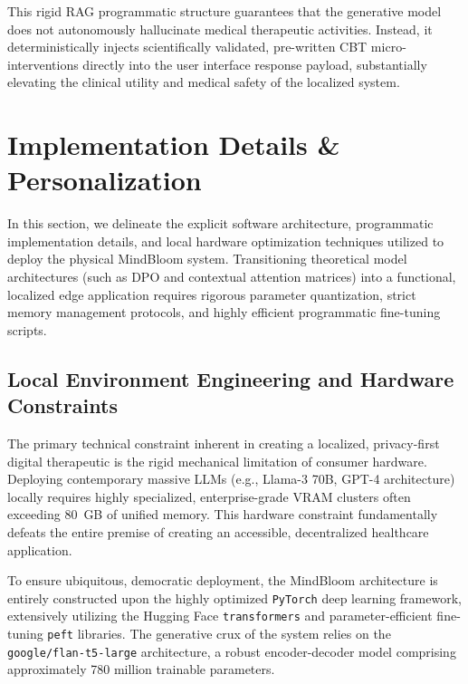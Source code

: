 \documentclass[12pt,twoside]{article}
\begin{document}
This rigid RAG programmatic structure guarantees that the generative model does not autonomously hallucinate medical therapeutic activities. Instead, it deterministically injects scientifically validated, pre-written CBT micro-interventions directly into the user interface response payload, substantially elevating the clinical utility and medical safety of the localized system.

\section{Implementation Details \& Personalization}

In this section, we delineate the explicit software architecture, programmatic implementation details, and local hardware optimization techniques utilized to deploy the physical MindBloom system. Transitioning theoretical model architectures (such as DPO and contextual attention matrices) into a functional, localized edge application requires rigorous parameter quantization, strict memory management protocols, and highly efficient programmatic fine-tuning scripts.

\subsection{Local Environment Engineering and Hardware Constraints}

The primary technical constraint inherent in creating a localized, privacy-first digital therapeutic is the rigid mechanical limitation of consumer hardware. Deploying contemporary massive LLMs (e.g., Llama-3 70B, GPT-4 architecture) locally requires highly specialized, enterprise-grade VRAM clusters often exceeding 80~GB of unified memory. This hardware constraint fundamentally defeats the entire premise of creating an accessible, decentralized healthcare application.

To ensure ubiquitous, democratic deployment, the MindBloom architecture is entirely constructed upon the highly optimized \texttt{PyTorch} deep learning framework, extensively utilizing the Hugging Face \texttt{transformers} and parameter-efficient fine-tuning \texttt{peft} libraries. The generative crux of the system relies on the \texttt{google/flan-t5-large} architecture, a robust encoder-decoder model comprising approximately 780 million trainable parameters.
\end{document}
